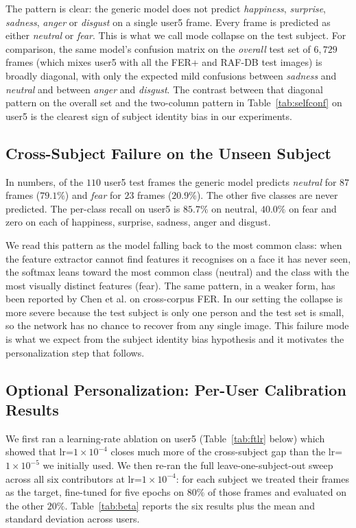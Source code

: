 \documentclass[12pt,a4paper]{article}
\begin{document}
The pattern is clear: the generic model does not predict
\emph{happiness}, \emph{surprise}, \emph{sadness},
\emph{anger} or \emph{disgust} on a single user5 frame. Every
frame is predicted as either \emph{neutral} or \emph{fear}.
This is what we call mode collapse on the test subject. For
comparison, the same model's confusion matrix on the
\emph{overall} test set of $6{,}729$ frames (which mixes
user5 with all the FER+ and RAF-DB test images) is broadly
diagonal, with only the expected mild confusions between
\emph{sadness} and \emph{neutral} and between \emph{anger}
and \emph{disgust}. The contrast between that diagonal
pattern on the overall set and the two-column pattern in
Table~\ref{tab:selfconf} on user5 is the clearest sign of
subject identity bias in our experiments.

\subsection{Cross-Subject Failure on the Unseen Subject}
\label{sec:results:failure}

In numbers, of the $110$ user5 test frames the generic model
predicts \emph{neutral} for $87$ frames ($79.1\%$) and
\emph{fear} for $23$ frames ($20.9\%$). The other five classes
are never predicted. The per-class recall on user5 is
$85.7\%$ on neutral, $40.0\%$ on fear and zero on each of
happiness, surprise, sadness, anger and disgust.

We read this pattern as the model falling back to the most
common class: when the feature extractor cannot find features
it recognises on a face it has never seen, the softmax leans
toward the most common class (neutral) and the class with the
most visually distinct features (fear). The same pattern, in a
weaker form, has been reported by Chen et al.
\autocite{chen2021agra} on cross-corpus FER. In our setting the
collapse is more severe because the test subject is only one
person and the test set is small, so the network has no chance
to recover from any single image. This failure mode is what we
expect from the subject identity bias hypothesis and it
motivates the personalization step that follows.

\subsection{Optional Personalization: Per-User Calibration Results}
\label{sec:results:personalize}

We first ran a learning-rate ablation on user5
(Table~\ref{tab:ftlr} below) which showed that
lr=$1\times 10^{-4}$ closes much more of the cross-subject
gap than the lr=$1\times 10^{-5}$ we initially used. We then
re-ran the full leave-one-subject-out sweep across all six
contributors at lr=$1\times 10^{-4}$: for each subject we
treated their frames as the target, fine-tuned for five
epochs on $80\%$ of those frames and evaluated on the other
$20\%$. Table~\ref{tab:beta} reports the six results plus
the mean and standard deviation across users.
\end{document}
